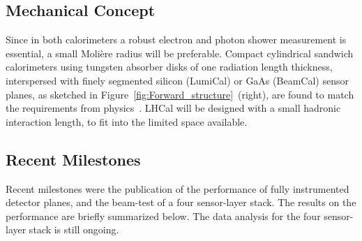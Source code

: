 \subsection{Mechanical Concept}
Since in both calorimeters a robust electron and photon shower measurement
is essential, a small Moli\`{e}re radius will be preferable.
Compact
cylindrical sandwich
calorimeters using tungsten absorber disks of one radiation length thickness, interspersed with
finely segmented silicon (LumiCal) or GaAs (BeamCal) sensor planes, as sketched in
Figure~\ref{fig:Forward_structure}~(right),
are found
to match the requirements from physics~\cite{2010JInst...512002A}.
LHCal will be designed with a small hadronic interaction length, to fit into the limited space available.

\subsection{Recent Milestones}
Recent milestones were the publication of the performance of fully instrumented detector planes, and the beam-test of a four
sensor-layer stack. The results on the performance are briefly summarized below.
The data analysis for the four sensor-layer stack is still ongoing.

